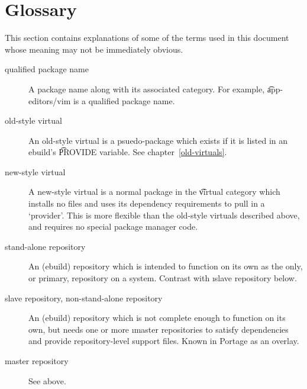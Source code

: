 \chapter{Glossary}
\label{glossary}

This section contains explanations of some of the terms used in this document whose meaning may not
be immediately obvious.

\begin{description}
\item[qualified package name] A package name along with its associated category. For example,
    \t{app-editors/vim} is a qualified package name.
\item[old-style virtual] An old-style virtual is a psuedo-package which exists if it is listed in an
    ebuild's \t{PROVIDE} variable. See chapter~\ref{old-virtuals}.
\item[new-style virtual] A new-style virtual is a normal package in the \t{virtual} category which
    installs no files and uses its dependency requirements to pull in a `provider'. This is more
    flexible than the old-style virtuals described above, and requires no special package manager
    code.
\item[stand-alone repository] An (ebuild) repository which is intended to function on its own as the
    only, or primary, repository on a system. Contrast with \i{slave repository} below.
\item[slave repository, non-stand-alone repository] An (ebuild) repository which is not complete
    enough to function on its own, but needs one or more \i{master repositories} to
    satisfy dependencies and provide repository-level support files. Known in Portage as an overlay.
\item[master repository] See above.

\end{description}



